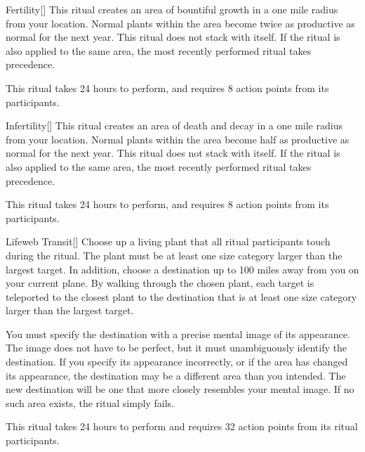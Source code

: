 \lowercase{\hypertarget{spell:Fertility}{}}\label{spell:Fertility}
\begin{apability}[Rank 3]{\hypertarget{spell:Fertility}{Fertility}}[]
\targetrule
This ritual creates an area of bountiful growth in a one mile radius  from your location.
Normal plants within the area become twice as productive as normal for the next year.
This ritual does not stack with itself.
If the  ritual is also applied to the same area, the most recently performed ritual takes precedence.

This ritual takes 24 hours to perform, and requires 8 action points from its participants.
\end{apability}
\vspace{0.25em}



\lowercase{\hypertarget{spell:Infertility}{}}\label{spell:Infertility}
\begin{apability}[Rank 3]{\hypertarget{spell:Infertility}{Infertility}}[]
\targetrule
This ritual creates an area of death and decay in a one mile radius  from your location.
Normal plants within the area become half as productive as normal for the next year.
This ritual does not stack with itself.
If the  ritual is also applied to the same area, the most recently performed ritual takes precedence.

This ritual takes 24 hours to perform, and requires 8 action points from its participants.
\end{apability}
\vspace{0.25em}



\lowercase{\hypertarget{spell:Lifeweb Transit}{}}\label{spell:Lifeweb Transit}
\begin{apability}[Rank 5]{\hypertarget{spell:Lifeweb Transit}{Lifeweb Transit}}[]
Choose up a living plant that all ritual participants touch during the ritual.
The plant must be at least one size category larger than the largest target.
In addition, choose a destination up to 100 miles away from you on your current plane.
By walking through the chosen plant, each target is teleported to the closest plant to the destination that is at least one size category larger than the largest target.

You must specify the destination with a precise mental image of its appearance.
The image does not have to be perfect, but it must unambiguously identify the destination.
If you specify its appearance incorrectly, or if the area has changed its appearance, the destination may be a different area than you intended.
The new destination will be one that more closely resembles your mental image.
If no such area exists, the ritual simply fails.

This ritual takes 24 hours to perform and requires 32 action points from its ritual participants.
\end{apability}
\vspace{0.25em}


